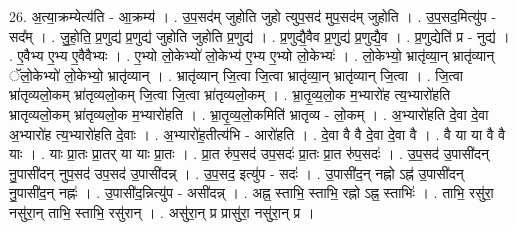 \documentclass[17pt]{extarticle}
\begin{document}
26. अ॒त्या॒क्रम्येत्य॑ति - आ॒क्रम्य॑ । . उ॒प॒सद॑म् जुहोति जुहो त्युप॒सद॑ मुप॒सद॑म् जुहोति । . उ॒प॒सद॒मित्यु॑प - सद᳚म् । . जु॒हो॒ति॒ प्र॒णुद्य॑ प्र॒णुद्य॑ जुहोति जुहोति प्र॒णुद्य॑ । . प्र॒णुद्यै॒वैव प्र॒णुद्य॑ प्र॒णुद्यै॒व । . प्र॒णुद्येति॑ प्र - नुद्य॑ । . ए॒वैभ्य ए॒भ्य ए॒वैवैभ्यः । . ए॒भ्यो लो॒केभ्यो॑ लो॒केभ्य॑ ए॒भ्य ए॒भ्यो लो॒केभ्यः॑ । . लो॒केभ्यो॒ भ्रातृ॑व्या॒न् भ्रातृ॑व्यान् ॅलो॒केभ्यो॑ लो॒केभ्यो॒ भ्रातृ॑व्यान् । . भ्रातृ॑व्यान् जि॒त्वा जि॒त्वा भ्रातृ॑व्या॒न् भ्रातृ॑व्यान् जि॒त्वा । . जि॒त्वा भ्रा॑तृव्यलो॒कम् भ्रा॑तृव्यलो॒कम् जि॒त्वा जि॒त्वा भ्रा॑तृव्यलो॒कम् । . भ्रा॒तृ॒व्य॒लो॒क म॒भ्यारो॑ह त्य॒भ्यारो॑हति भ्रातृव्यलो॒कम् भ्रा॑तृव्यलो॒क म॒भ्यारो॑हति । . भ्रा॒तृ॒व्य॒लो॒कमिति॑ भ्रातृव्य - लो॒कम् । . अ॒भ्यारो॑हति दे॒वा दे॒वा अ॒भ्यारो॑ह त्य॒भ्यारो॑हति दे॒वाः । . अ॒भ्यारो॑ह॒तीत्य॑भि - आरो॑हति । . दे॒वा वै वै दे॒वा दे॒वा वै । . वै या या वै वै याः । . याः प्रा॒तः प्रा॒तर् या याः प्रा॒तः । . प्रा॒त रु॑प॒सद॑ उप॒सदः॑ प्रा॒तः प्रा॒त रु॑प॒सदः॑ । . उ॒प॒सद॑ उ॒पासी॑दन् नु॒पासी॑दन् नुप॒सद॑ उप॒सद॑ उ॒पासी॑दन्न् । . उ॒प॒सद॒ इत्यु॑प - सदः॑ । . उ॒पासी॑द॒न् नह्नो ऽह्न॑ उ॒पासी॑दन् नु॒पासी॑द॒न् नह्नः॑ । . उ॒पासी॑द॒न्नित्यु॑प - असी॑दन्न् । . अह्न॒ स्ताभि॒ स्ताभि॒ रह्नो ऽह्न॒ स्ताभिः॑ । . ताभि॒ रसु॑रा॒ नसु॑रा॒न् ताभि॒ स्ताभि॒ रसु॑रान् । . असु॑रा॒न् प्र प्रासु॑रा॒ नसु॑रा॒न् प्र । \newline
\end{document}
